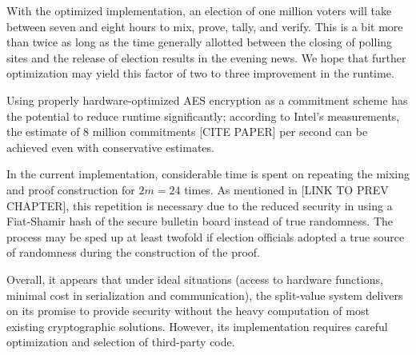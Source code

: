 With the optimized implementation, an election of one million voters will take between seven and eight hours to mix, prove, tally, and verify. This is a bit more than twice as long as the time generally allotted between the closing of polling sites and the release of election results in the evening news. We hope that further optimization may yield this factor of two to three improvement in the runtime.

Using properly hardware-optimized AES encryption as a commitment scheme has the potential to reduce runtime significantly; according to Intel's measurements, the estimate of 8 million commitments [CITE PAPER] per second can be achieved even with conservative estimates.

In the current implementation, considerable time is spent on repeating the mixing and proof construction for $2m = 24$ times. As mentioned in [LINK TO PREV CHAPTER], this repetition is necessary due to the reduced security in using a Fiat-Shamir hash of the secure bulletin board instead of true randomness. The process may be sped up at least twofold if election officials adopted a true source of randomness during the construction of the proof.

Overall, it appears that under ideal situations (access to hardware functions, minimal cost in serialization and communication), the split-value system delivers on its promise to provide security without the heavy computation of most existing cryptographic solutions. However, its implementation requires careful optimization and selection of third-party code.
